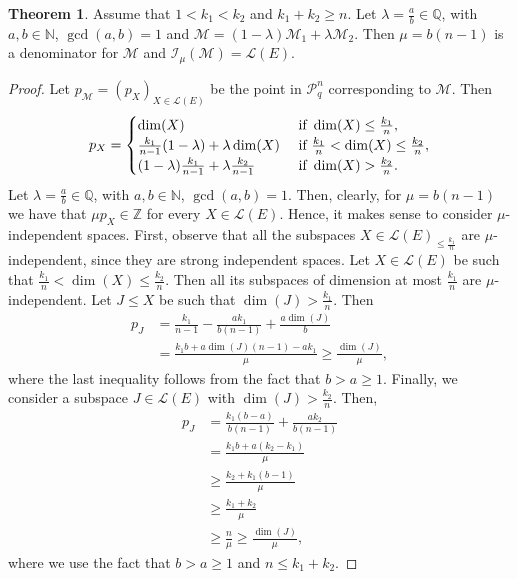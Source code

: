 \documentclass[a4paper,11pt,reqno]{amsart}
\theoremstyle{definition}
\newtheorem{theorem}{Theorem}[section]
\newcommand{\mM}{\mathcal{M}}
\newcommand{\mL}{\mathcal{L}}
\newcommand{\mI}{\mathcal{I}}
\newcommand{\RP}{\mathcal{P}_q^n}
\begin{document}
{\begin{theorem}\label{thm: mu_indep_poly}
    Assume that $1< k_1<k_2$ and $k_1+k_2\geq n$.  Let $\lambda=\frac{a}{b}\in\mathbb{Q}$, with $a,b\in\mathbb{N}$, $\gcd(a,b)=1$ and $\mM=(1-\lambda)\mM_1+\lambda\mM_2$. Then $\mu=b(n-1)$ is a denominator for $\mM$ and $\mI_\mu(\mM) = \mL(E)$.
\end{theorem}
\begin{proof}
     Let $p_\mM=(p_X)_{X\in\mL(E)}$ be the point in $\RP$ corresponding to $\mM$. Then 
    $$p_X = \begin{cases}
        \dim(X) & \textnormal{ if }\dim(X)\leq \frac{k_1}{n},\\
        \frac{k_1}{n-1}(1-\lambda)+\lambda\dim(X)   & \textnormal{ if } \frac{k_1}{n}<\dim(X)\leq \frac{k_2}{n},\\
        (1-\lambda)\frac{k_1}{n-1} + \lambda \frac{k_2}{n-1} & \textnormal{ if } \dim(X)>\frac{k_2}{n}.
    \end{cases}$$
    Let $\lambda=\frac{a}{b}\in\mathbb{Q}$, with $a,b\in\mathbb{N}$, $\gcd(a,b)=1$. Then, clearly, for $\mu=b(n-1)$ we have that $\mu p_X\in\mathbb{Z}$ for every $X\in\mL(E)$. Hence, it makes sense to consider $\mu$-independent spaces. First, observe that all the subspaces $X\in\mL(E)_{\leq \frac{k_1}{n}}$ are $\mu$-independent, since they are strong independent spaces. Let $X\in\mL(E)$ be such that $\frac{k_1}{n}<\dim(X)\leq \frac{k_2}{n}$. Then all its subspaces of dimension at most $\frac{k_1}{n}$ are $\mu$-independent. Let $J\leq X$ be such that $\dim(J)>\frac{k_1}{n}$. Then 
    \begin{align*}
        p_J &= \frac{k_1}{n-1} -\frac{ak_1}{b(n-1)} + \frac{a\dim(J)}{b} \\
        &=\frac{k_1 b + a\dim(J)(n-1) - ak_1}{\mu} \geq \frac{\dim(J)}{\mu},
    \end{align*}
    where the last inequality follows from the fact that $b>a\geq 1$. Finally, we consider a subspace $J\in\mL(E)$ with $\dim(J)>\frac{k_2}{n}$. Then,
    \begin{align*}
        p_J&= \frac{k_1(b-a)}{b(n-1)} + \frac{ak_2}{b(n-1)}\\
        &=\frac{k_1b + a(k_2-k_1)}{\mu}\\
        &\geq \frac{k_2 + k_1(b-1)}{\mu}\\
        &\geq \frac{k_1+k_2}{\mu} \\
        &\geq \frac{n}{\mu}\geq \frac{\dim(J)}{\mu},
    \end{align*}
    where we use the fact that $b>a\geq 1$ and $n\leq k_1+k_2$.
\end{proof}



}
\end{document}
